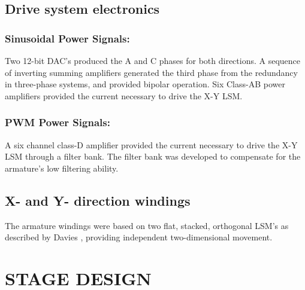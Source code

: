 \documentclass[10pt,twocolumn]{witseiepaper}
\begin{document}
\subsection{Drive system electronics}

\subsubsection*{Sinusoidal Power Signals:}
Two 12-bit DAC's produced the A and C phases for both directions.  A sequence
of inverting summing amplifiers generated the third phase from the redundancy
in three-phase systems, and provided bipolar operation.  Six Class-AB power
amplifiers provided the current necessary to drive the X-Y LSM.

\subsubsection*{PWM Power Signals:}
A six channel class-D amplifier provided the current necessary to drive the
X-Y LSM through a filter bank. The filter bank was developed to compensate for
the armature's low filtering ability.

\subsection{X- and Y- direction windings}

The armature windings were based on two flat, stacked, orthogonal LSM's as
described by Davies \cite{Simon}, providing independent two-dimensional
movement.

\section{STAGE DESIGN}
\end{document}
